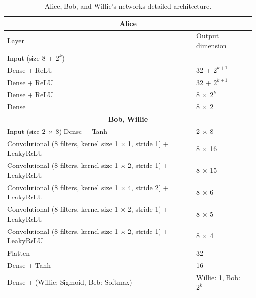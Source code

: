 \begin{table}[tp!]
	\begin{adjustbox}{width=0.85\columnwidth,center}
		\begin{tabular}{|l|l|} 
			\hline
			\multicolumn{2}{|c|}{\textbf{Alice}} 															\\
			\hline
			Layer 																	&	Output dimension	\\
			\hline
			Input (size 8 + $2^k$)      											&	-    	 		    \\ 
			Dense + ReLU          													&	32 + $2^{k+1}$		\\
			Dense + ReLU          													&	32 + $2^{k+1}$		\\
			Dense + ReLU   															&	8 $\times$ $2^k$	\\
			Dense																	&	8 $\times$ 2	\\
			\hline   
			\hline												
			\multicolumn{2}{|c|}{\textbf{Bob, Willie}} 											\\
			\hline
			Input (size 2 $\times$ 8)
			Dense + Tanh																&	2 $\times$ 8			\\
			Convolutional (8 filters, kernel size 1 $\times$ 1, stride 1) + LeakyReLU 	&   8 $\times$ 16			\\
			Convolutional (8 filters, kernel size 1 $\times$ 2, stride 1) + LeakyReLU 	&   8 $\times$ 15			\\
			Convolutional (8 filters, kernel size 1 $\times$ 4, stride 2) + LeakyReLU 	&   8 $\times$ 6			\\
			Convolutional (8 filters, kernel size 1 $\times$ 2, stride 1) + LeakyReLU 	&   8 $\times$ 5			\\
			Convolutional (8 filters, kernel size 1 $\times$ 2, stride 1) + LeakyReLU 	&   8 $\times$ 4			\\
			Flatten															 			&   32						\\
			Dense + Tanh																&	16						\\
			Dense + (Willie: Sigmoid, Bob: Softmax)										&	Willie: 1, Bob:	$2^k$	\\
			\hline
		\end{tabular}
	\end{adjustbox}
	\caption{Alice, Bob, and Willie's networks detailed architecture.}
	\label{table:covert_models_structure}
\end{table}

